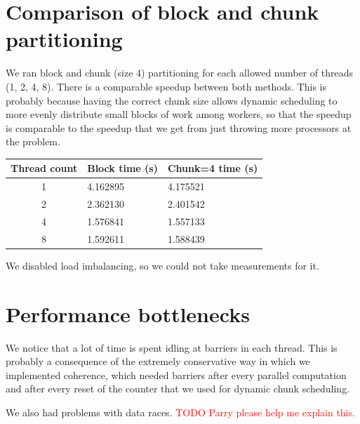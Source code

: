 \documentclass{article}[12pt;letterpaper]
\newcommand{\todo}[1]{\textcolor{red}{TODO #1}}
\begin{document}
\section{Comparison of block and chunk partitioning}

We ran block and chunk (size 4) partitioning for each allowed number of threads
(1, 2, 4, 8). There is a comparable speedup between both methods. This is
probably because having the correct chunk size allows dynamic scheduling to
more evenly distribute small blocks of work among workers, so that the speedup
is comparable to the speedup that we get from just throwing more processors at
the problem.

\begin{tabular}{c l l}
Thread count & Block time (s) & Chunk=4 time (s) \\
\hline{}
1 & 4.162895 & 4.175521 \\
2 & 2.362130 & 2.401542 \\
4 & 1.576841 & 1.557133 \\
8 & 1.592611 & 1.588439
\end{tabular}

We disabled load imbalancing, so we could not take measurements for it.

\section{Performance bottlenecks}

We notice that a lot of time is spent idling at barriers in each thread. This
is probably a consequence of the extremely conservative way in which we
implemented coherence, which needed barriers after every parallel computation
and after every reset of the counter that we used for dynamic chunk scheduling.

We also had problems with data races. \todo{Parry please help me explain this.}
\end{document}
